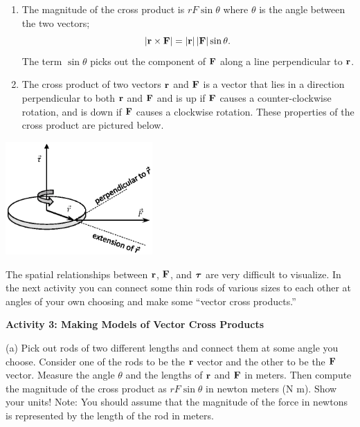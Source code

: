 \begin{enumerate}
\item The magnitude of the cross product is $rF\sin\theta$ where \( \theta  \)
is the angle between the two vectors; 
\[
\left| {\bf r}\times {\bf F}\right| =\left| {\bf r}\right| \left| {\bf F}\right| \sin \theta .\]
The term \( \sin \theta  \) picks out the component of \( {\bf F} \)
along a line perpendicular to \( {\bf r} \).
\item The cross product of two vectors \( {\bf r} \) and \( {\bf F} \)
is a vector that lies in a direction perpendicular to both \( {\bf r} \)
and \( {\bf F} \) and is up if \( {\bf F} \) causes
a counter-clockwise rotation, and is down if \( {\bf F} \) causes
a clockwise rotation. These properties of the cross product are pictured below.
\end{enumerate}
{\par\centering \includegraphics[height=1.7in]{ang_mom/ang_mom_fig3_new.eps} \par}

The spatial relationships between \( {\bf r} \), \( {\bf F} \),
and \( {\mbox{\boldmath$\tau$} } \) are very difficult to visualize. In the next
activity you can connect some thin rods of various sizes to each other at angles
of your own choosing and make some ``vector cross products.''

\textbf{Activity 3: Making Models of Vector Cross Products} 

(a) Pick out rods of two different lengths and connect them at some angle you
choose. Consider one of the rods to be the \( {\bf r} \) vector
and the other to be the \( {\bf F} \) vector. Measure the angle
\( \theta  \) and the lengths of \( {\bf r} \) and \( {\bf F} \)
in meters. Then compute the magnitude of the cross product as 
$rF\sin \theta $
in newton meters (N m). Show your units! Note: You should assume that the magnitude
of the force in newtons is represented by the length of the rod in meters.
\vspace{20mm}

